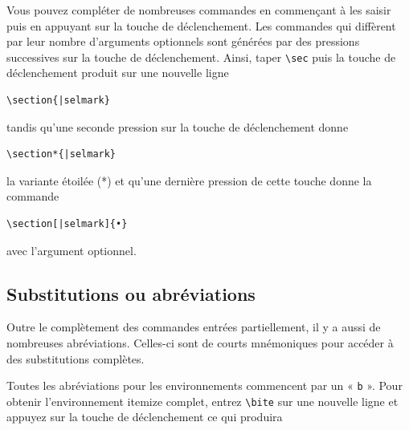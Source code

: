 \documentclass[11pt,french]{article}
\newcommand{\cmd}[1]{\textsf{#1}}
\begin{document}
Vous pouvez compléter de nombreuses commandes en commençant à les saisir puis en appuyant sur la touche de déclenchement. Les commandes qui diffèrent par leur nombre d'arguments optionnels sont générées par des pressions successives sur la touche de déclenchement. Ainsi, taper \verb|\sec| puis la touche de déclenchement produit sur une nouvelle ligne

\begin{verbatim}
\section{|selmark}
\end{verbatim}
tandis qu'une seconde pression sur la touche de déclenchement donne
\begin{verbatim}
\section*{|selmark}
\end{verbatim}
la variante étoilée (*) et qu'une dernière pression de cette touche donne la commande
\begin{verbatim}
\section[|selmark]{•}
\end{verbatim}
avec l'argument optionnel.

\subsection{Substitutions ou abréviations}

Outre le complètement des commandes entrées partiellement, il y a aussi de nombreuses abréviations. Celles-ci sont de courts mnémoniques pour accéder à des substitutions complètes.

Toutes les abréviations pour les environnements commencent par un « \texttt{b} ». Pour obtenir l'environnement  \cmd{itemize} complet, entrez \verb|\bite| sur une nouvelle ligne et appuyez sur la touche de déclenchement ce qui produira
\end{document}
